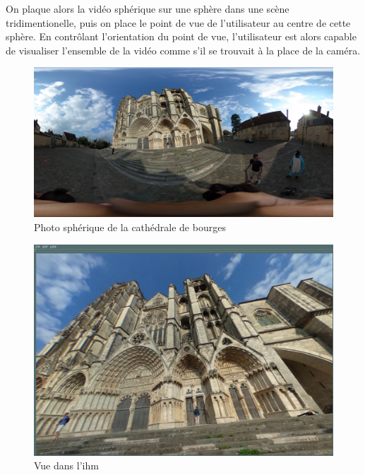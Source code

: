 			On \og plaque \fg{} alors la vidéo sphérique sur une sphère dans une scène tridimentionelle, puis on place le point de vue de l'utilisateur au centre de cette sphère. En contrôlant l'orientation du point de vue, l'utilisateur est alors capable de visualiser l'ensemble de la vidéo comme s'il se trouvait à la place de la caméra.
			\begin{figure}[H]
			{
				\centering
				\includegraphics[width=.8\textwidth]{figures/cathedrale_eq.jpg}
				\caption{Photo sphérique de la cathédrale de bourges}
				\label{fig:pannot}
			}
			\end{figure}
			\begin{figure}[H]
			{
				\centering
				\includegraphics[width=.8\textwidth]{figures/cathedral_ihm.png}
				\caption{Vue dans l'\gls{ihm}}
				\label{fig:pannot}
			}
			\end{figure}
			

